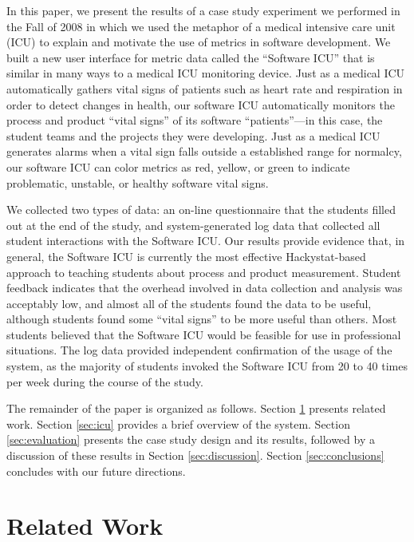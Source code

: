 \documentclass{acm_proc_article-sp}
\begin{document}
In this paper, we present the results of a case study experiment we
performed in the Fall of 2008 in which we used the metaphor of a medical
intensive care unit (ICU) to explain and motivate the use of metrics in
software development.  We built a new user interface for metric data called
the ``Software ICU'' that is similar in many ways to a medical ICU
monitoring device.  Just as a medical ICU automatically gathers vital signs
of patients such as heart rate and respiration in order to detect changes
in health, our software ICU automatically monitors the process and product
``vital signs'' of its software ``patients''---in this case, the student
teams and the projects they were developing.  Just as a medical ICU
generates alarms when a vital sign falls outside a established range for
normalcy, our software ICU can color metrics as red, yellow, or green to
indicate problematic, unstable, or healthy software vital signs. 

We collected two types of data: an on-line questionnaire that the students
filled out at the end of the study, and system-generated log data that
collected all student interactions with the Software ICU.  Our results
provide evidence that, in general, the Software ICU is currently the most
effective Hackystat-based approach to teaching students about process and
product measurement.  Student feedback indicates that the overhead involved
in data collection and analysis was acceptably low, and almost all of the
students found the data to be useful, although students found some ``vital
signs'' to be more useful than others. Most students believed that the
Software ICU would be feasible for use in professional situations.  The log
data provided independent confirmation of the usage of the system, as the
majority of students invoked the Software ICU from 20 to 40 times per week
during the course of the study.

The remainder of the paper is organized as follows.  Section
\ref{sec:related} presents related work.  Section \ref{sec:icu} provides a
brief overview of the system. Section \ref{sec:evaluation} presents the
case study design and its results, followed by a discussion of these results
in Section \ref{sec:discussion}.   Section \ref{sec:conclusions} concludes with 
our future directions.

\section {Related Work}
\label{sec:related}
\end{document}
